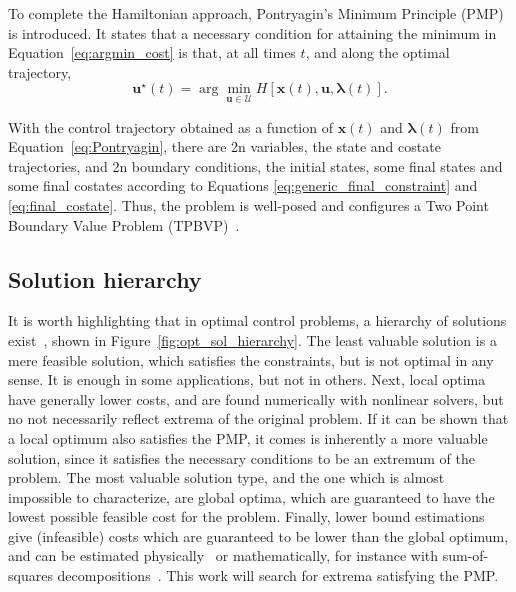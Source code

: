To complete the Hamiltonian approach, Pontryagin's Minimum Principle (PMP) is introduced. It states that a necessary condition for attaining the minimum in Equation~\eqref{eq:argmin_cost} is that, at all times \(t\), and along the optimal trajectory,~\cite{bertsekas}
\begin{equation} \label{eq:Pontryagin}
    \mathbf{u}^\star(t) = \arg \min_{\mathbf{u} \in \mathcal{U}} H[\mathbf{x}(t), \mathbf{u}, \mathbf{\lambda}(t)].
\end{equation}

With the control trajectory obtained as a function of \(\mathbf{x}(t)\) and \(\mathbf{\lambda}(t)\) from Equation~\eqref{eq:Pontryagin}, there are 2n variables, the state and costate trajectories, and 2n boundary conditions, the initial states, some final states and some final costates according to Equations \eqref{eq:generic_final_constraint} and \eqref{eq:final_costate}. Thus, the problem is well-posed and configures a Two Point Boundary Value Problem (TPBVP)~\cite{bryson_applied_optimal_control}.

\subsection{Solution hierarchy}

It is worth highlighting that in optimal control problems, a hierarchy of solutions exist~\cite{ross2015primer}, shown in Figure~\ref{fig:opt_sol_hierarchy}. The least valuable solution is a mere feasible solution, which satisfies the constraints, but is not optimal in any sense. It is enough in some applications, but not in others. Next, local optima have generally lower costs, and are found numerically with nonlinear solvers, but no not necessarily reflect extrema of the original problem. If it can be shown that a local optimum also satisfies the PMP, it comes is inherently a more valuable solution, since it satisfies the necessary conditions to be an extremum of the problem. The most valuable solution type, and the one which is almost impossible to characterize, are global optima, which are guaranteed to have the lowest possible feasible cost for the problem. Finally, lower bound estimations give (infeasible) costs which are guaranteed to be lower than the global optimum, and can be estimated physically~\cite{impulsive_europa} or mathematically, for instance with sum-of-squares decompositions~\cite{sos_book}. This work will search for extrema satisfying the PMP.

